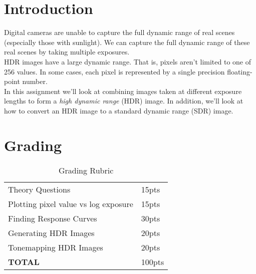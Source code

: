 \documentclass[12pt]{article}
\begin{document}
\maketitle


\section*{Introduction}
Digital cameras are unable to capture the full dynamic range of real scenes (especially those with sunlight). We can capture the full dynamic range of these real scenes by taking multiple exposures.\\

\noindent
HDR images have a large dynamic range. That is, pixels aren't limited to one of 256 values. In some cases, each pixel is represented by a single precision floating-point number.\\

\noindent
In this assignment we'll look at combining images taken at different exposure lengths to form a \textit{high dynamic range} (HDR) image.  In addition, we'll look at how to convert an HDR image to a standard dynamic range (SDR) image.\\


\section*{Grading}
\begin{table}[h]
\begin{centering}
\begin{tabular}{|l|l|}
\hline
Theory Questions & 15pts \\
Plotting pixel value vs log exposure & 15pts\\
Finding Response Curves & 30pts\\
Generating HDR Images & 20pts\\
Tonemapping HDR Images & 20pts\\
\hline
\textbf{TOTAL} & 100pts\\
\hline
\end{tabular}
\caption{Grading Rubric}
\end{centering}
\end{table}

\newpage
\end{document}
